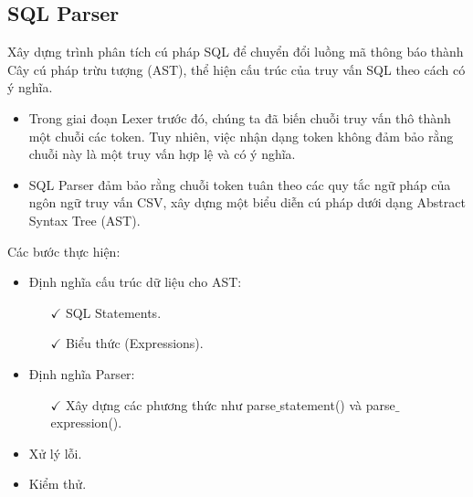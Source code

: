 \documentclass{beamer}
\begin{document}
	\subsection{SQL Parser}
	\begin{frame}
		\begin{tcolorbox}[colback=yellow!10!white,colframe=red!75!black,title= Mục tiêu]
			Xây dựng trình phân tích cú pháp SQL để chuyển đổi luồng mã thông báo thành Cây cú pháp trừu tượng (AST), thể hiện cấu trúc của truy vấn SQL theo cách có ý nghĩa.
		\end{tcolorbox}
		\begin{itemize}
			\item Trong giai đoạn Lexer trước đó, chúng ta đã biến chuỗi truy vấn thô thành một chuỗi các token. Tuy nhiên, việc nhận dạng token không đảm bảo rằng chuỗi này là một truy vấn hợp lệ và có ý nghĩa.
			\item SQL Parser đảm bảo rằng chuỗi token tuân theo các quy tắc ngữ pháp của ngôn ngữ truy vấn CSV, xây dựng một biểu diễn cú pháp dưới dạng Abstract Syntax Tree (AST).
		\end{itemize}
	\end{frame}
	
	\begin{frame}
		Các bước thực hiện:
		\begin{itemize}
			\item Định nghĩa cấu trúc dữ liệu cho AST:
			\begin{itemize}
				\item[$\checkmark$] SQL Statements.
				\item[$\checkmark$] Biểu thức (Expressions).
			\end{itemize}
			\item Định nghĩa Parser:
			\begin{itemize}
				\item[$\checkmark$] Xây dựng các phương thức như parse$\_$statement() và parse$\_$expression().
			\end{itemize}
			\item Xử lý lỗi.
			\item Kiểm thử.
		\end{itemize}
	\end{frame}
	
\end{document}
